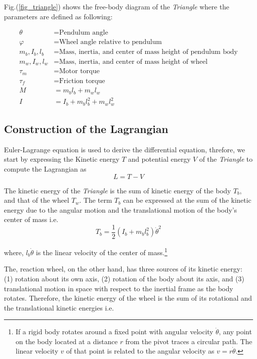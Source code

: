 \documentclass{article}
\begin{document}
Fig.(\ref{fig_triangle}) shows the free-body diagram of the \textit{Triangle} where the parameters are defined as following:

\begin{align*}
  \theta &= \text{Pendulum angle} \\
  \varphi &= \text{Wheel angle relative to pendulum} \\
  m_b, I_b, l_b &= \text{Mass, inertia, and center of mass height of pendulum body} \\
  m_w, I_w, l_w &= \text{Mass, inertia, and center of mass height of wheel} \\
  \tau_m &= \text{Motor torque} \\
  \tau_f &= \text{Friction torque} \\
  M &= m_b l_b + m_w l_w \\
  I &= I_b + m_b l_b^2 + m_w l_w^2
\end{align*}

\subsection{Construction of the Lagrangian}

Euler-Lagrange equation is used to derive the differential equation, threfore, we start by expressing the Kinetic energy $T$ and potential energy $V$ of the \textit{Triangle} to compute the Lagrangian as
\begin{equation}
  \label{eqn_lagrangian}
  L=T-V
\end{equation}

The kinetic energy of the \textit{Triangle} is the sum of kinetic energy of the body $T_{b}$, and that of the wheel $T_{w}$. The term $T_{b}$ can be expressed at the sum of the kinetic energy due to the angular motion and the translational motion of the body's center of mass i.e.
\begin{equation}
  T_b=\dfrac{1}{2}\left(I_{b} + m_{b} l_{b}^{2}\right)\dot{\theta}^{2}
\end{equation}

where, $l_{b}\dot{\theta}$ is the linear velocity of the center of mass.\footnote{If a rigid body rotates around a fixed point with angular velocity $\dot{\theta}$, any point on the body located at a distance $r$ from the pivot traces a circular path. The linear velocity $v$ of that point is related to the angular velocity as $v=r\dot{\theta}$.}

The, reaction wheel, on the other hand, has three sources of its kinetic energy: (1) rotation about its own axis, (2) rotation of the body about its axis, and (3) translational motion in space with respect to the inertial frame as the body rotates. Therefore, the kinetic energy of the wheel is the sum of its rotational and the translational kinetic energies i.e.
\end{document}
